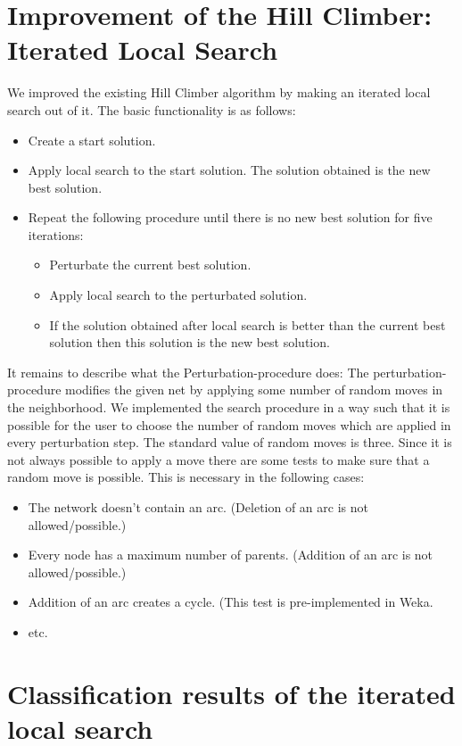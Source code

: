 \documentclass[paper=a4, fontsize=11pt]{scrartcl} %
\numberwithin{equation}{section} %
\numberwithin{figure}{section} %
\numberwithin{table}{section} %
\begin{document}
\section{Improvement of the Hill Climber: Iterated Local Search}

We improved the existing Hill Climber algorithm by making an iterated local search out of it. The basic functionality is as follows:

\begin{itemize}
	\item Create a start solution.
	\item Apply local search to the start solution. The solution obtained is the new best solution.
	\item Repeat the following procedure until there is no new best solution for five iterations:
		\begin{itemize}
			\item Perturbate the current best solution.
			\item Apply local search to the perturbated solution.
			\item If the solution obtained after local search is better than the current best solution then this solution is the new best solution.
		\end{itemize}
\end{itemize}

It remains to describe what the Perturbation-procedure does: The perturbation-procedure modifies the given net by applying some number of random moves in the neighborhood. We implemented the search procedure in a way such that it is possible for the user to choose the number of random moves which are applied in every perturbation step. The standard value of random moves is three. Since it is not always possible to apply a move there are some tests to make sure that a random move is possible. This is necessary in the following cases:

\begin{itemize}
	\item The network doesn't contain an arc. (Deletion of an arc is not allowed/possible.)
	\item Every node has a maximum number of parents. (Addition of an arc is not allowed/possible.)
	\item Addition of an arc creates a cycle. (This test is pre-implemented in Weka.
	\item etc.
\end{itemize}

\section{Classification results of the iterated local search}
\end{document}
